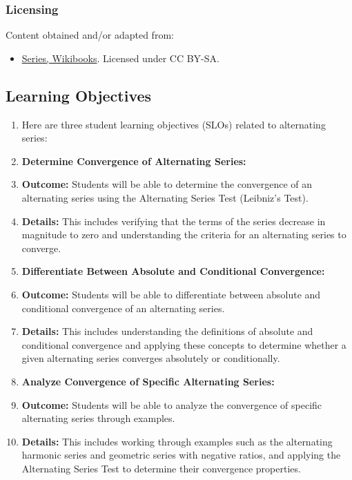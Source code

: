 \subsubsection{Licensing}
\label{sss:lice-7352}

Content obtained and/or adapted from:

\begin{itemize}

\item \href{https://en.wikibooks.org/wiki/User:Dcljr/Series}{Series, Wikibooks}. 
Licensed under CC BY-SA.

\end{itemize}

\subsection{Learning Objectives}

\begin{enumerate}
    \item Here are three student learning objectives (SLOs) related to alternating series:
    \item \textbf{Determine Convergence of Alternating Series:}
    \item \textbf{Outcome:} Students will be able to determine the convergence of an alternating series using the Alternating Series Test (Leibniz's Test).
    \item \textbf{Details:} This includes verifying that the terms of the series decrease in magnitude to zero and understanding the criteria for an alternating series to converge.
    \item \textbf{Differentiate Between Absolute and Conditional Convergence:}
    \item \textbf{Outcome:} Students will be able to differentiate between absolute and conditional convergence of an alternating series.
    \item \textbf{Details:} This includes understanding the definitions of absolute and conditional convergence and applying these concepts to determine whether a given alternating series converges absolutely or conditionally.
    \item \textbf{Analyze Convergence of Specific Alternating Series:}
    \item \textbf{Outcome:} Students will be able to analyze the convergence of specific alternating series through examples.
    \item \textbf{Details:} This includes working through examples such as the alternating harmonic series and geometric series with negative ratios, and applying the Alternating Series Test to determine their convergence properties.
\end{enumerate}

